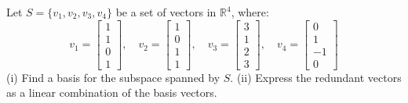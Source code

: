 \documentclass[11pt,a4paper]{article}
\begin{document}
\begin{questionbox}
Let $S = \{ v_1, v_2, v_3, v_4 \}$ be a set of vectors in $\mathbb{R}^4$, where:
\[ v_1 = \begin{bmatrix} 1 \\ 1 \\ 0 \\ 1 \end{bmatrix}, \quad v_2 = \begin{bmatrix} 1 \\ 0 \\ 1 \\ 1 \end{bmatrix}, \quad v_3 = \begin{bmatrix} 3 \\ 1 \\ 2 \\ 3 \end{bmatrix}, \quad v_4 = \begin{bmatrix} 0 \\ 1 \\ -1 \\ 0 \end{bmatrix} \]
(i) Find a basis for the subspace spanned by $S$.
(ii) Express the redundant vectors as a linear combination of the basis vectors.
\end{questionbox}
\end{document}
